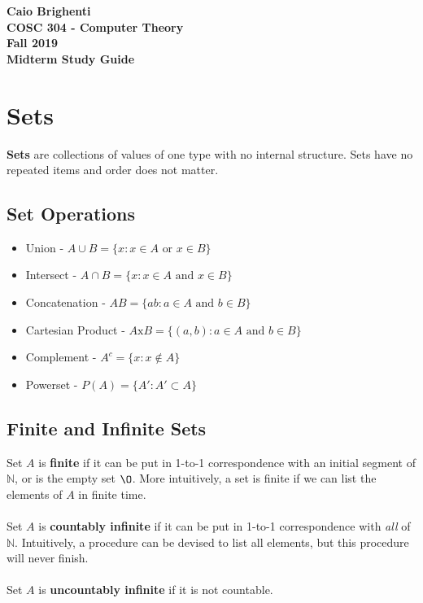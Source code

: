 \documentclass{article}
\begin{document}
\noindent \textbf{Caio Brighenti }\\
\noindent \textbf{COSC 304 - Computer Theory}\\%
\noindent \textbf{Fall 2019}\\%
\noindent \textbf{Midterm Study Guide}\vspace{1em}\\
	\section{Sets}
	\textbf{Sets} are collections of values of one type with no internal structure. Sets have no repeated items and order does not matter.
		\subsection{Set Operations}
			\begin{itemize}
				\item Union - $A \cup B = \{x : x \in A \text{ or } x \in B\}$
				\item Intersect - $ A \cap B = \{ x : x \in A \text{ and } x \in B\}$
				\item Concatenation - $AB = \{ ab : a \in A \text{ and } b \in B\}$
				\item Cartesian Product - $A \text{x} B  = \{(a,b) : a \in A \text{ and } b \in B\}$
				\item Complement - $A^c = \{x : x \notin A\}$
				\item Powerset - $P(A) = \{A' : A' \subset A\}$
			\end{itemize}
		\subsection{Finite and Infinite Sets}
			Set $A$ is \textbf{finite} if it can be put in 1-to-1 correspondence with an initial segment of $\mathbb{N}$, or is the empty set $\O$. More intuitively, a set is finite if we can list the elements of $A$ in finite time.
			\\\\ Set $A$ is \textbf{countably infinite} if it can be put in 1-to-1 correspondence with \emph{all} of $\mathbb{N}$. Intuitively, a procedure can be devised to list all elements, but this procedure will never finish.
			\\\\ Set $A$ is \textbf{uncountably infinite} if it is not countable.
\end{document}
